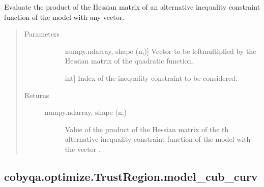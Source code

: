 \documentclass[letterpaper,10pt,english]{sphinxmanual}
\begin{document}
\begin{fulllineitems}
\begin{fulllineitems}
\label{\detokenize{refs/generated/cobyqa.optimize.TrustRegion.model_cub_alt_hessp:cobyqa.optimize.TrustRegion.model_cub_alt_hessp}}
\sphinxAtStartPar
Evaluate the product of the Hessian matrix of an alternative inequality
constraint function of the model with any vector.
\begin{quote}\begin{description}
\item[{Parameters}] \leavevmode\begin{description}
\item[{}] \leavevmode{[}numpy.ndarray, shape (n,){]}
\sphinxAtStartPar
Vector to be left\sphinxhyphen{}multiplied by the Hessian matrix of the quadratic
function.

\item[{}] \leavevmode{[}int{]}
\sphinxAtStartPar
Index of the inequality constraint to be considered.

\end{description}

\item[{Returns}] \leavevmode\begin{description}
\item[{numpy.ndarray, shape (n,)}] \leavevmode
\sphinxAtStartPar
Value of the product of the Hessian matrix of the \sphinxhyphen{}th alternative
inequality constraint function of the model with the vector .

\end{description}

\end{description}\end{quote}

\end{fulllineitems}



\subsection{cobyqa.optimize.TrustRegion.model\_cub\_curv}
\label{\detokenize{refs/generated/cobyqa.optimize.TrustRegion.model_cub_curv:cobyqa-optimize-trustregion-model-cub-curv}}\label{\detokenize{refs/generated/cobyqa.optimize.TrustRegion.model_cub_curv::doc}}


\end{fulllineitems}
\end{document}
